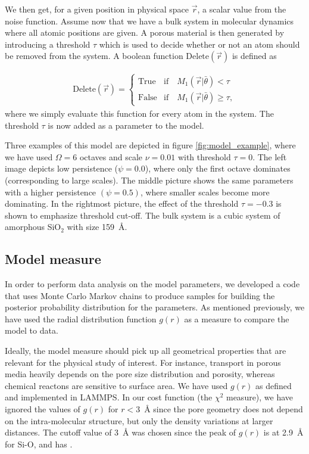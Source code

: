 \documentclass[aps,pre,twocolumn,letterpaper,floatfix,showpacs]{revtex4}
\begin{document}
We then get, for a given position in physical space $\vec r$, a scalar value from the noise function.
Assume now that we have a bulk system in molecular dynamics where all atomic positions are given.
A porous material is then generated by introducing a threshold $\tau$ which is used to decide whether or not an atom should be removed from the system.
A boolean function $\text{Delete}(\vec r)$ is defined as

\begin{align}
  \text{Delete}(\vec r) = 
  \begin{cases} 
    \text{True} & \text{if} \quad M_1(\vec r |\bar \theta) < \tau \\
    \text{False} & \text{if} \quad M_1(\vec r |\bar \theta) \geq \tau,
  \end{cases}
  \label{eq:delete_threshold}
\end{align}
where we simply evaluate this function for every atom in the system.
The threshold $\tau$ is now added as a parameter to the model.

Three examples of this model are depicted in figure \ref{fig:model_example}, where we have
used $\Omega=6$ octaves and scale $\nu=0.01$ with threshold $\tau=0$. The left
image depicts low persistence ($\psi = 0.0$), where only the first octave dominates
(corresponding to large scales). The middle picture shows the same parameters with
a higher persistence $(\psi = 0.5)$, where smaller scales become more dominating.
In the rightmost picture, the effect of the threshold $\tau = -0.3$ is shown to emphasize threshold cut-off.
The bulk system is a cubic system of amorphous SiO$_2$ with size \SI{159}{\angstrom}.

\subsection{Model measure}
In order to perform data analysis on the model parameters, we developed a code that
uses Monte Carlo Markov chains to produce samples for building the posterior probability distribution for the parameters. 
As mentioned previously, we have used the radial distribution function $g(r)$ as a measure to compare the model to data.

Ideally, the model measure should pick up all geometrical properties that are
relevant for the physical study of interest. 
For instance, transport in porous media heavily depends on the pore size distribution and porosity\cite{kozeny1927uber, carman1937fluid},
whereas chemical reactons are sensitive to surface area\cite{coussy2011mechanics}. We have used $g(r)$ as defined and implemented in LAMMPS\cite{plimpton1995fast}.
In our cost function (the $\chi^2$ measure), we have ignored the values of $g(r)$ for $r<$\SI{3}{\angstrom} since the pore geometry does not depend on the intra-molecular structure, but only the density variations at larger distances.
The cutoff value of \SI{3}{\angstrom} was chosen since the peak of $g(r)$ is at \SI{2.9}{\angstrom} for Si-O\cite{vashishta1990interaction}, and has .
\end{document}
